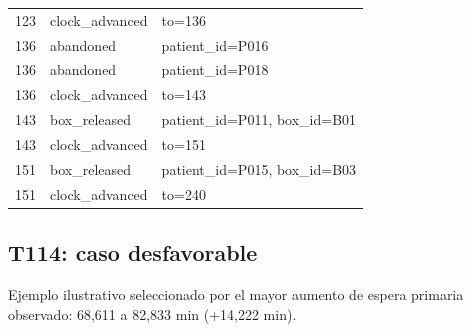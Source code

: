 \begin{longtable}{r p{2.2cm} p{4.2cm}}
123 & clock\_advanced & to=136 \\
136 & abandoned & patient\_id=P016 \\
136 & abandoned & patient\_id=P018 \\
136 & clock\_advanced & to=143 \\
143 & box\_released & patient\_id=P011, box\_id=B01 \\
143 & clock\_advanced & to=151 \\
151 & box\_released & patient\_id=P015, box\_id=B03 \\
151 & clock\_advanced & to=240 \\
\bottomrule
\end{longtable}

\subsection{T114: caso desfavorable}
Ejemplo ilustrativo seleccionado por el mayor aumento de espera primaria observado: 68,611 a 82,833 min (+14,222 min).
